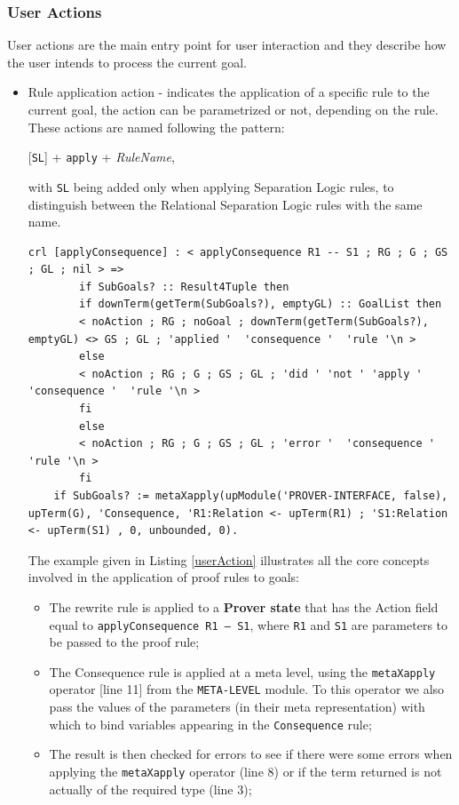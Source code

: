 \documentclass[12pt,a4paper]{article}
\begin{document}
{\subsubsection{User Actions}
User actions are the main entry point for user interaction and they describe how the user intends to process the current goal.
\begin{itemize}
	\item {Rule application action - indicates the application of a specific rule to the current goal, the action can be parametrized or not, depending on the rule. These actions are named following the pattern:	
	\begin{center}
		[\texttt{SL}] + \texttt{apply} + \textit{RuleName},
	\end{center}
		with \texttt{SL} being added only when applying Separation Logic rules, to distinguish between the Relational Separation Logic rules with the same name.
	}
		\begin{lstlisting}[label=userAction,caption=Rule Application Action]
	crl [applyConsequence] : < applyConsequence R1 -- S1 ; RG ; G ; GS ; GL ; nil > =>
		if SubGoals? :: Result4Tuple then 
		if downTerm(getTerm(SubGoals?), emptyGL) :: GoalList then
		< noAction ; RG ; noGoal ; downTerm(getTerm(SubGoals?), emptyGL) <> GS ; GL ; 'applied '  'consequence '  'rule '\n > 
		else
		< noAction ; RG ; G ; GS ; GL ; 'did ' 'not ' 'apply ' 'consequence '  'rule '\n > 
		fi
		else 
		< noAction ; RG ; G ; GS ; GL ; 'error '  'consequence '  'rule '\n > 
		fi 
	if SubGoals? := metaXapply(upModule('PROVER-INTERFACE, false), upTerm(G), 'Consequence, 'R1:Relation <- upTerm(R1) ; 'S1:Relation <- upTerm(S1) , 0, unbounded, 0).\end{lstlisting}
		The example given in Listing \ref{userAction} illustrates all the core concepts involved in the application of proof rules to goals: 
		\begin{itemize}
			\item The rewrite rule is applied to a \textbf{Prover state} that has the Action field equal to \texttt{applyConsequence R1 --- S1}, where \texttt{R1} and \texttt{S1} are parameters to be passed to the proof rule;
			\item The Consequence rule is applied at a meta level, using the \texttt{metaXapply} operator [line 11] from the \texttt{META-LEVEL} module. To this operator we also pass the values of the parameters (in their meta representation) with which to bind variables appearing in the \texttt{Consequence} rule;
			\item The result is then checked for errors to see if there were some errors when applying the \texttt{metaXapply} operator (line 8) or if the term returned is not actually of the required type (line 3);

\end{itemize}
\end{itemize}}
\end{document}
